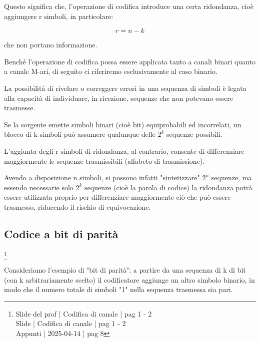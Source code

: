 Questo significa che, l'operazione di codifica introduce una certa ridondanza, 
cioè aggiungere r simboli, in particolare: 

{
    \Large 
    \begin{equation}
        r = n - k
    \end{equation}
}

che non portano informazione. \newline 

Benché l'operazione di codifica possa essere applicata tanto a canali binari quanto a canale M-ari, 
di seguito ci riferiremo esclusivamente al caso binario. \newline 

La possibilità di rivelare o correggere errori in una sequenza di simboli è legata alla capacità di individuare, 
in ricezione, sequenze che non potevano essere trasmesse. \newline 

Se la sorgente emette simboli binari (cioè bit) equiprobabili ed incorrelati, 
un blocco di k simboli può assumere qualunque delle $2^{k}$ sequenze possibili. \newline 

L'aggiunta degli r simboli di ridondanza, al contrario, consente di differenziare maggiormente le sequenze trasmissibili (alfabeto di trasmissione). \newline 

Avendo a disposizione n simboli, si possono infatti "sintetizzare" $2^{n}$ sequenze, 
ma essendo necessarie solo $2^{k}$ sequenze (cioè la parola di codice) 
la ridondanza potrà essere utilizzata proprio per differenziare maggiormente ciò che può essere trasmesso, 
riducendo il rischio di equivocazione. \newline 

\newpage 

\subsection{Codice a bit di parità}
\footnote{Slide del prof | Codifica di canale | pag 1 - 2\\ 
Slide | Codifica di canale | pag  1 - 2\\
Appunti | 2025-04-14 | pag 8
} 

Consideriamo l'esempio di "bit di parità": 
a partire da una sequenza di k di bit (con k arbitrariamente scelto) 
il codificatore aggiunge un altro simbolo binario, 
in modo che il numero totale di simboli "1" nella sequenza trasmessa sia pari. \newline 

